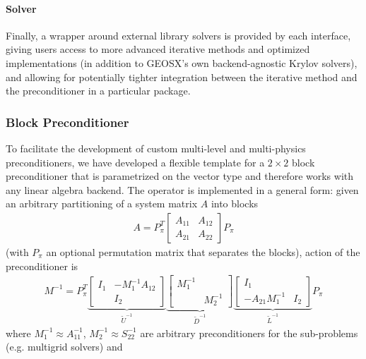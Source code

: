 \paragraph{Solver}
Finally, a wrapper around external library solvers is provided by each interface, giving users access to more advanced iterative methods and optimized implementations (in addition to GEOSX's own backend-agnostic Krylov solvers), and allowing for potentially tighter integration between the iterative method and the preconditioner in a particular package.

\subsubsection{Block Preconditioner}
\label{subsubsec:geosx_block_precond}

To facilitate the development of custom multi-level and multi-physics preconditioners, we have developed a flexible template for a $2 \times 2$ block preconditioner that is parametrized on the vector type and therefore works with any linear algebra backend.   The operator is implemented in a general form: given an arbitrary partitioning of a system matrix $A$ into blocks
\begin{align}
  A = P_\pi^T
  \begin{bmatrix}
      A_{11} & A_{12} \\
      A_{21} & A_{22}
  \end{bmatrix}
  P_\pi
  \label{eq:block_precond_part}
\end{align}
(with $P_\pi$ an optional permutation matrix that separates the blocks), action of the preconditioner is 
\begin{align}
  M^{-1} = P_\pi^T
  \underbrace{\begin{bmatrix}
  I_1 & -M_1^{-1}A_{12} \\
      &  I_2
  \end{bmatrix}}_{\widetilde{U}^{-1}}
  \underbrace{\begin{bmatrix}
  M_1^{-1} &            \\
           & M_2^{-1}
  \end{bmatrix}}_{\widetilde{D}^{-1}}
  \underbrace{\begin{bmatrix}
   I_1            &       \\
  -A_{21}M_1^{-1} & I_2
  \end{bmatrix}}_{\widetilde{L}^{-1}}
  P_\pi
  \label{eq:block_precond}
\end{align}
where $M_1^{-1} \approx A_{11}^{-1}$, $M_2^{-1} \approx S_{22}^{-1}$ are arbitrary preconditioners for the sub-problems (e.g. multigrid solvers) and
